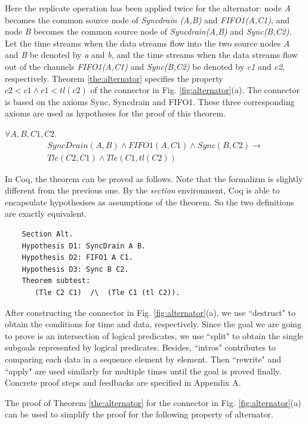 \documentclass{llncs}
\begin{document}
\begin{example}
Here the replicate operation has been applied twice for the alternator: node \emph{A} becomes the common source node of \emph{Syncdrain (A,B)} and \emph{FIFO1(A,C1)}, and node \emph{B} becomes the common source node of \emph{Syncdrain(A,B)} and \emph{Sync(B,C2)}. Let the time streams when the
data streams flow into the two source nodes \emph{A} and \emph{B} be denoted by \emph{a} and \emph{b}, and the time streams when the data streams
flow out of the channels \emph{FIFO1(A,C1)} and \emph{Sync(B,C2)} be denoted by \emph{c1} and \emph{c2}, respectively. Theorem \ref{the:alternator}
specifies the property $c2<c1 \wedge c1<tl (c2)$ of the connector in Fig. \ref{fig:alternator}(a). The connector is based on the axioms
Sync, Syncdrain and FIFO1. These three corresponding axioms are used as hypotheses for the proof of this theorem.
\begin{theorem}[subtest]\label{the:alternator}
$\forall A,B,C1,C2.$
\begin{eqnarray*}
  & SyncDrain(A,B)\land FIFO1(A,C1)\land Sync(B,C2)  \rightarrow & \\
  & Tle(C2,C1) \wedge Tle(C1, tl(C2))
\end{eqnarray*}
\end{theorem}
In Coq, the theorem can be proved as follows. Note that the formalizm is slightly different from the previous one. By the \emph{section} environment, Coq is able to encapsulate hypothesises as assumptions of the theorem. So the two definitions are exactly equivalent.

\begin{verbatim}
    Section Alt.
    Hypothesis D1: SyncDrain A B.
    Hypothesis D2: FIFO1 A C1.
    Hypothesis D3: Sync B C2.
    Theorem subtest:
       (Tle C2 C1)  /\  (Tle C1 (tl C2)).
\end{verbatim}

After constructing the connector in Fig. \ref{fig:alternator}(a), we use ``destruct" to obtain the conditions for time and data, respectively.
Since the goal we are going to prove is an intersection of logical predicates, we use ``split" to obtain the single subgoals represented by
logical predicates. Besides, ``intros" contributes to comparing each data in a sequence element by element. Then ``rewrite" and ``apply" are
used similarly for multiple times until the goal is proved finally. %
Concrete proof steps and feedbacks are specified in Appendix A.

The proof of Theorem \ref{the:alternator} for the connector in Fig. \ref{fig:alternator}(a) can be used to simplify the proof for the following
property of alternator.


\end{example}
\end{document}
